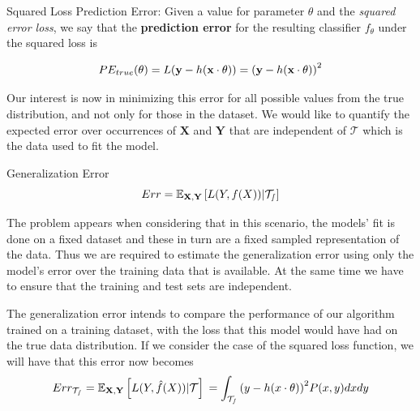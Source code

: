\begin{definition}{Squared Loss Prediction Error:}
	Given a value for parameter $\theta$ and the \textit{squared error loss}, we say that the \textbf{prediction error} for the resulting classifier $f_\theta$ under the squared loss is

	\begin{equation}
	PE_{true}(\theta) =L(\textbf{y} - h(\textbf{x} \cdot \theta) )  \\
	=  {(\textbf{y} - h(\textbf{x} \cdot \theta) )}^2
	\end{equation}

\end{definition}

Our interest is now in minimizing this error for all possible values from the true distribution, and not only for those in the dataset.
We would like to quantify the expected error over occurrences of $\textbf{X}$ and $\textbf{Y}$ that are independent of $\mathcal{T}$ which is the data used to fit the model.



\begin{definition}{Generalization Error}
\begin{equation}
Err = \operatorname{\mathbb{E}}_{ \textbf{X}, \textbf{Y} } \left[ L(Y,f(X))  | \mathcal{T_s} \right]
\end{equation}
\end{definition}

The problem appears when considering that in this scenario, the models' fit is done on a fixed dataset
and these in turn are a fixed sampled representation of the data.
Thus we are required to estimate the generalization error using only the model's error over the training data that is available.
At the same time we have to ensure that the training and test sets are independent.


The generalization error intends to compare the performance of our algorithm trained on a training dataset, with the loss that this model would have had on the true data distribution.
If we consider the case of the squared loss function, we will have that this error now becomes
\begin{equation}
	Err_{\mathcal{T_s}} = \operatorname{\mathbb{E}}_{\textbf{X},\textbf{Y}} \left[ L(Y,\hat{f}(X)) | \mathcal{T}\right] \\
	= \int_{\mathcal{T_s}} {(y - h(x \cdot \theta) )}^2 P(x,y)dxdy
	\label{eq:squaredGeneralizationError}
\end{equation}

